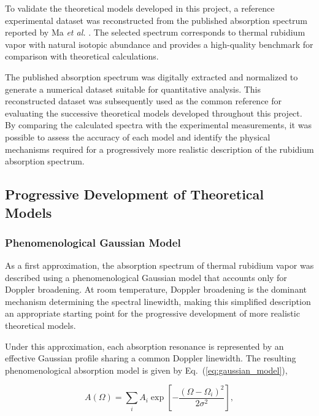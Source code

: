 \documentclass[11pt]{article}
\numberwithin{equation}{section}
\begin{document}
To validate the theoretical models developed in this project, a reference experimental dataset was reconstructed from the published absorption spectrum reported by Ma \textit{et al.} \cite{Ma2017}. The selected spectrum corresponds to thermal rubidium vapor with natural isotopic abundance and provides a high-quality benchmark for comparison with theoretical calculations.

The published absorption spectrum was digitally extracted and normalized to generate a numerical dataset suitable for quantitative analysis. This reconstructed dataset was subsequently used as the common reference for evaluating the successive theoretical models developed throughout this project. By comparing the calculated spectra with the experimental measurements, it was possible to assess the accuracy of each model and identify the physical mechanisms required for a progressively more realistic description of the rubidium absorption spectrum.

\subsection{Progressive Development of Theoretical Models}

\subsubsection{Phenomenological Gaussian Model}

As a first approximation, the absorption spectrum of thermal rubidium vapor was described using a phenomenological Gaussian model that accounts only for Doppler broadening. At room temperature, Doppler broadening is the dominant mechanism determining the spectral linewidth, making this simplified description an appropriate starting point for the progressive development of more realistic theoretical models.

Under this approximation, each absorption resonance is represented by an effective Gaussian profile sharing a common Doppler linewidth. The resulting phenomenological absorption model is given by Eq.~(\ref{eq:gaussian_model}),

\begin{equation}
\label{eq:gaussian_model}
A(\Omega)=
\sum_i A_i
\exp\left[
-\frac{(\Omega-\Omega_i)^2}{2\sigma^2}
\right],
\end{equation}
\end{document}
